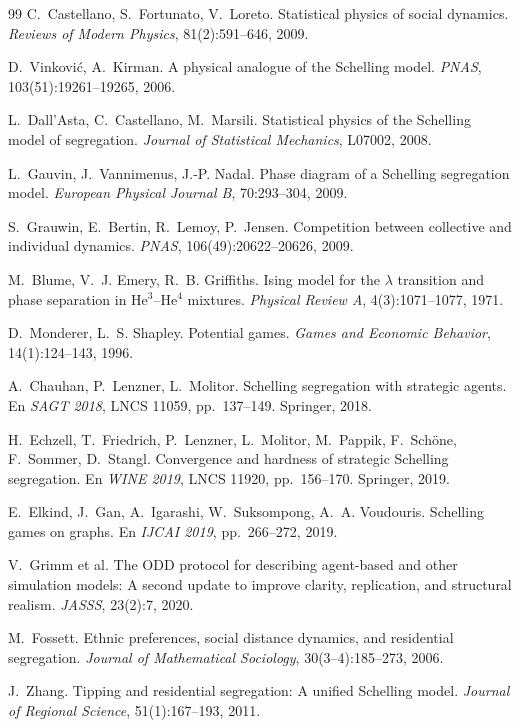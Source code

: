 \documentclass[11pt,a4paper]{article}
\theoremstyle{plain}
\theoremstyle{definition}
\theoremstyle{remark}
\begin{document}
\begin{thebibliography}{99}
 C.~Castellano, S.~Fortunato, V.~Loreto. Statistical
physics of social dynamics. \emph{Reviews of Modern Physics}, 81(2):591--646,
2009.

 D.~Vinković, A.~Kirman. A physical analogue of the
Schelling model. \emph{PNAS}, 103(51):19261--19265, 2006.

 L.~Dall'Asta, C.~Castellano, M.~Marsili. Statistical
physics of the Schelling model of segregation. \emph{Journal of Statistical
Mechanics}, L07002, 2008.

 L.~Gauvin, J.~Vannimenus, J.-P. Nadal. Phase diagram of
a Schelling segregation model. \emph{European Physical Journal B},
70:293--304, 2009.

 S.~Grauwin, E.~Bertin, R.~Lemoy, P.~Jensen. Competition
between collective and individual dynamics. \emph{PNAS},
106(49):20622--20626, 2009.

 M.~Blume, V.~J. Emery, R.~B. Griffiths. Ising model for the
$\lambda$ transition and phase separation in He$^3$--He$^4$ mixtures.
\emph{Physical Review A}, 4(3):1071--1077, 1971.

 D.~Monderer, L.~S. Shapley. Potential games.
\emph{Games and Economic Behavior}, 14(1):124--143, 1996.

 A.~Chauhan, P.~Lenzner, L.~Molitor. Schelling
segregation with strategic agents. En \emph{SAGT 2018}, LNCS 11059,
pp.~137--149. Springer, 2018.

 H.~Echzell, T.~Friedrich, P.~Lenzner, L.~Molitor,
M.~Pappik, F.~Schöne, F.~Sommer, D.~Stangl. Convergence and hardness of
strategic Schelling segregation. En \emph{WINE 2019}, LNCS 11920,
pp.~156--170. Springer, 2019.

 E.~Elkind, J.~Gan, A.~Igarashi, W.~Suksompong,
A.~A. Voudouris. Schelling games on graphs. En \emph{IJCAI 2019},
pp.~266--272, 2019.

 V.~Grimm et al. The ODD protocol for describing
agent-based and other simulation models: A second update to improve clarity,
replication, and structural realism. \emph{JASSS}, 23(2):7, 2020.

 M.~Fossett. Ethnic preferences, social distance
dynamics, and residential segregation. \emph{Journal of Mathematical
Sociology}, 30(3--4):185--273, 2006.

 J.~Zhang. Tipping and residential segregation: A unified
Schelling model. \emph{Journal of Regional Science}, 51(1):167--193, 2011.

\end{thebibliography}
\end{document}
